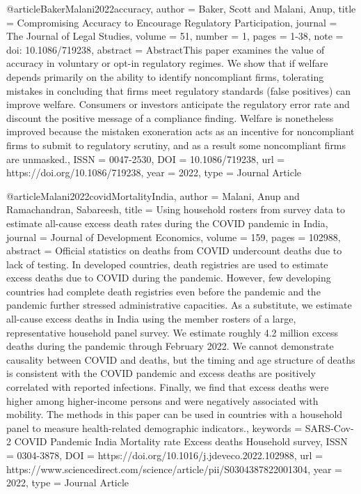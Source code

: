 {{{@article{BakerMalani2022accuracy,
   author = {Baker, Scott and Malani, Anup},
   title = {Compromising Accuracy to Encourage Regulatory Participation},
   journal = {The Journal of Legal Studies},
   volume = {51},
   number = {1},
   pages = {1-38},
   note = {doi: 10.1086/719238},
   abstract = {AbstractThis paper examines the value of accuracy in voluntary or opt-in regulatory regimes. We show that if welfare depends primarily on the ability to identify noncompliant firms, tolerating mistakes in concluding that firms meet regulatory standards (false positives) can improve welfare. Consumers or investors anticipate the regulatory error rate and discount the positive message of a compliance finding. Welfare is nonetheless improved because the mistaken exoneration acts as an incentive for noncompliant firms to submit to regulatory scrutiny, and as a result some noncompliant firms are unmasked.},
   ISSN = {0047-2530},
   DOI = {10.1086/719238},
   url = {https://doi.org/10.1086/719238},
   year = {2022},
   type = {Journal Article}
}

@article{Malani2022covidMortalityIndia,
   author = {Malani, Anup and Ramachandran, Sabareesh},
   title = {Using household rosters from survey data to estimate all-cause excess death rates during the COVID pandemic in India},
   journal = {Journal of Development Economics},
   volume = {159},
   pages = {102988},
   abstract = {Official statistics on deaths from COVID undercount deaths due to lack of testing. In developed countries, death registries are used to estimate excess deaths due to COVID during the pandemic. However, few developing countries had complete death registries even before the pandemic and the pandemic further stressed administrative capacities. As a substitute, we estimate all-cause excess deaths in India using the member rosters of a large, representative household panel survey. We estimate roughly 4.2 million excess deaths during the pandemic through February 2022. We cannot demonstrate causality between COVID and deaths, but the timing and age structure of deaths is consistent with the COVID pandemic and excess deaths are positively correlated with reported infections. Finally, we find that excess deaths were higher among higher-income persons and were negatively associated with mobility. The methods in this paper can be used in countries with a household panel to measure health-related demographic indicators.},
   keywords = {SARS-Cov-2
COVID
Pandemic
India
Mortality rate
Excess deaths
Household survey},
   ISSN = {0304-3878},
   DOI = {https://doi.org/10.1016/j.jdeveco.2022.102988},
   url = {https://www.sciencedirect.com/science/article/pii/S0304387822001304},
   year = {2022},
   type = {Journal Article}
}

}}}
